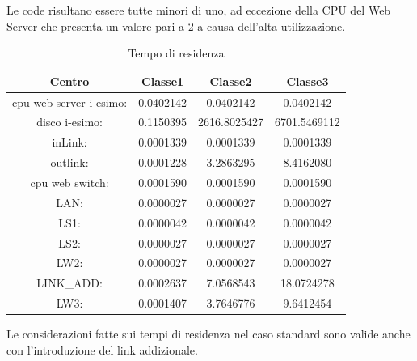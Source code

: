 Le code risultano essere tutte minori di uno, ad eccezione della CPU del Web Server che presenta un valore pari a 2 a causa dell'alta utilizzazione.
\begin{table}[H]
\begin{center}
\begin{tabular}{||c|c|c|c||}
\hline
Centro &Classe1 &Classe2 &Classe3\\
\hline
\hline
 cpu web server i-esimo: 	&0.0402142	&0.0402142	&0.0402142	\\\hline
 disco i-esimo: 	&0.1150395	&2616.8025427	&6701.5469112	\\\hline
 inLink: 	&0.0001339	&0.0001339	&0.0001339	\\\hline
 outlink: 	&0.0001228	&3.2863295	&8.4162080	\\\hline
 cpu web switch: 	&0.0001590	&0.0001590	&0.0001590	\\\hline
 LAN: 	&0.0000027	&0.0000027	&0.0000027	\\\hline
 LS1: 	&0.0000042	&0.0000042	&0.0000042	\\\hline
 LS2: 	&0.0000027	&0.0000027	&0.0000027	\\\hline
 LW2: 	&0.0000027	&0.0000027	&0.0000027	\\\hline
 LINK\_ADD: 	&0.0002637	&7.0568543	&18.0724278	\\\hline
 LW3: 	&0.0001407	&3.7646776	&9.6412454	\\\hline\hline
\end{tabular}
\end{center}
\caption{Tempo di residenza}
\label{tempodiresidenza}
\end{table}
Le considerazioni fatte sui tempi di residenza nel caso standard sono valide anche con l'introduzione del link addizionale. 
